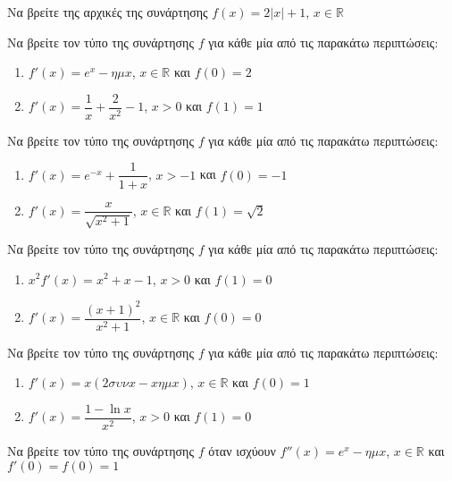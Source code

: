 \documentclass{../presentation}
\begin{document}
\begin{askisi}
  Να βρείτε της αρχικές της συνάρτησης $f(x)=2|x|+1$, $x\in\mathbb{R}$
\end{askisi}

\begin{askisi}
  Να βρείτε τον τύπο της συνάρτησης $f$ για κάθε μία από τις παρακάτω περιπτώσεις:
  \begin{enumerate}[<+->]
    \item $f'(x)=e^x-ημx$, $x\in\mathbb{R}$ και $f(0)=2$
    \item $f'(x)=\dfrac{1}{x}+\dfrac{2}{x^2}-1$, $x>0$ και $f(1)=1$
  \end{enumerate}
\end{askisi}

\begin{askisi}
  Να βρείτε τον τύπο της συνάρτησης $f$ για κάθε μία από τις παρακάτω περιπτώσεις:
  \begin{enumerate}[<+->]
    \item $f'(x)=e^{-x}+\dfrac{1}{1+x}$, $x>-1$ και $f(0)=-1$
    \item $f'(x)=\dfrac{x}{\sqrt{x^2+1}}$, $x\in\mathbb{R}$ και $f(1)=\sqrt{2}$
  \end{enumerate}
\end{askisi}

\begin{askisi}
  Να βρείτε τον τύπο της συνάρτησης $f$ για κάθε μία από τις παρακάτω περιπτώσεις:
  \begin{enumerate}[<+->]
    \item $x^2f'(x)=x^2+x-1$, $x>0$ και $f(1)=0$
    \item $f'(x)=\dfrac{(x+1)^2}{x^2+1}$, $x\in\mathbb{R}$ και $f(0)=0$
  \end{enumerate}
\end{askisi}

\begin{askisi}
  Να βρείτε τον τύπο της συνάρτησης $f$ για κάθε μία από τις παρακάτω περιπτώσεις:
  \begin{enumerate}[<+->]
    \item $f'(x)=x(2συνx-xημx)$, $x\in\mathbb{R}$ και $f(0)=1$
    \item $f'(x)=\dfrac{1-\ln x}{x^2}$, $x>0$ και $f(1)=0$
  \end{enumerate}
\end{askisi}

\begin{askisi}
  Να βρείτε τον τύπο της συνάρτησης $f$ όταν ισχύουν $f''(x)=e^x-ημx$, $x\in\mathbb{R}$ και $f'(0)=f(0)=1$
\end{askisi}
\end{document}
